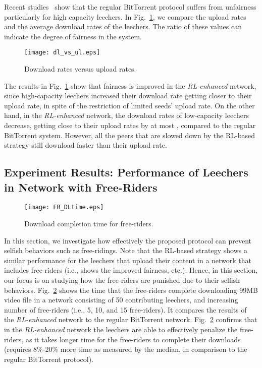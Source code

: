 Recent studies~\cite{piatek07,Buddies,bharambe06,guo05} show that 
the regular BitTorrent protocol suffers from unfairness particularly for high 
capacity leechers.
In Fig.~\ref{fig:dl_vs_ul}, we compare the upload rates and the average 
download rates of the leechers. The ratio of these values can indicate the 
degree of fairness in the system.
\begin{figure}[t]
\centering
\texttt{[image: dl\_vs\_ul.eps]}
\caption{Download rates versus upload rates.} 
\label{fig:dl_vs_ul}
\end{figure}
The results in Fig.~\ref{fig:dl_vs_ul} show that fairness is improved in 
the \emph{RL-enhanced} network, since high-capacity leechers increased their 
download rate getting closer to their upload rate, in spite of the restriction 
of limited seeds' upload rate. On the other hand, in the \emph{RL-enhanced} network, 
the download rates of low-capacity leechers decrease, getting close to their 
upload rates by at most , compared to the regular BitTorrent system.
However, all the peers that are slowed down by the RL-based 
strategy still  download faster than their upload rate. \\


\subsection{Experiment Results: Performance of Leechers in Network with
Free-Riders}

\begin{figure}[t]
\centering
\texttt{[image: FR\_DLtime.eps]}
\caption{Download completion time for free-riders.} 
\label{fig:FR_DLtime}
\end{figure}

In this section, we investigate how effectively the proposed protocol can 
prevent selfish behaviors such as free-ridings. Note that the RL-based strategy shows a similar performance for the leechers that upload 
their content in a network that includes free-riders (i.e., shows the 
improved fairness, etc.). Hence, in this section, our focus is on studying how 
the free-riders are punished due to their selfish behaviors. 
Fig.~\ref{fig:FR_DLtime} shows the time that the free-riders complete 
downloading 99MB video file in a network consisting of 50 contributing 
leechers, and increasing number of free-riders (i.e., 5, 10, and 15 
free-riders). It compares the results of the \emph{RL-enhanced} network to the 
regular BitTorrent network. Fig.~\ref{fig:FR_DLtime} confirms that in the 
\emph{RL-enhanced} network the leechers are able to effectively penalize the 
free-riders, as it takes longer time for the free-riders to complete their 
downloads (requires 8\%-20\% more time as measured by the median, in 
comparison to the regular BitTorrent protocol).

